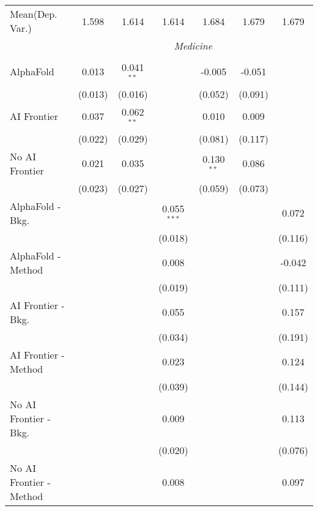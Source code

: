 \begin{tabular}{lcccccc}
Mean(Dep. Var.) & 1.598 & 1.614 & 1.614 & 1.684 & 1.679 & 1.679 \\
 & \multicolumn{6}{c}{\textit{Medicine}} \\ \\
   AlphaFold               & 0.013   & 0.041$^{**}$ &               & -0.005       & -0.051  &   \\   
                           & (0.013) & (0.016)      &               & (0.052)      & (0.091) &   \\   
   AI Frontier             & 0.037   & 0.062$^{**}$ &               & 0.010        & 0.009   &   \\   
                           & (0.022) & (0.029)      &               & (0.081)      & (0.117) &   \\   
   No AI Frontier          & 0.021   & 0.035        &               & 0.130$^{**}$ & 0.086   &   \\   
                           & (0.023) & (0.027)      &               & (0.059)      & (0.073) &   \\   
   AlphaFold - Bkg.        &         &              & 0.055$^{***}$ &              &         & 0.072\\   
                           &         &              & (0.018)       &              &         & (0.116)\\   
   AlphaFold - Method      &         &              & 0.008         &              &         & -0.042\\   
                           &         &              & (0.019)       &              &         & (0.111)\\   
   AI Frontier - Bkg.      &         &              & 0.055         &              &         & 0.157\\   
                           &         &              & (0.034)       &              &         & (0.191)\\   
   AI Frontier - Method    &         &              & 0.023         &              &         & 0.124\\   
                           &         &              & (0.039)       &              &         & (0.144)\\   
   No AI Frontier - Bkg.   &         &              & 0.009         &              &         & 0.113\\   
                           &         &              & (0.020)       &              &         & (0.076)\\   
   No AI Frontier - Method &         &              & 0.008         &              &         & 0.097\\   

\end{tabular}
